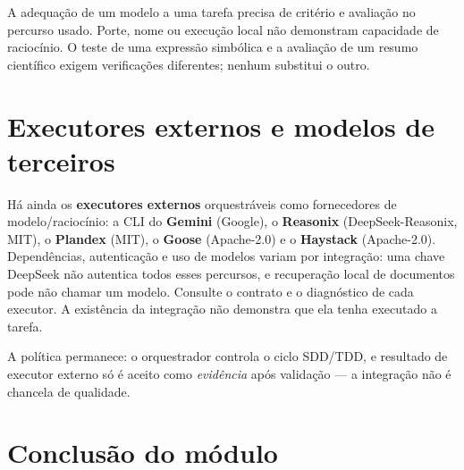 \begin{limite}
A adequação de um modelo a uma tarefa precisa de critério e avaliação no
percurso usado. Porte, nome ou execução local não demonstram capacidade de
raciocínio. O teste de uma expressão simbólica e a avaliação de um resumo
científico exigem verificações diferentes; nenhum substitui o outro.
\end{limite}

\clearpage
\section{Executores externos e modelos de terceiros}


\begin{descricao}
Há ainda os \textbf{executores externos} orquestráveis como fornecedores de
modelo/raciocínio: a CLI do \textbf{Gemini} (Google), o \textbf{Reasonix}
(DeepSeek-Reasonix, MIT), o \textbf{Plandex} (MIT), o \textbf{Goose} (Apache-2.0) e
o \textbf{Haystack} (Apache-2.0). Dependências, autenticação e uso de modelos
variam por integração: uma chave DeepSeek não autentica todos esses
percursos, e recuperação local de documentos pode não chamar um modelo.
Consulte o contrato e o diagnóstico de cada executor. A existência da
integração não demonstra que ela tenha executado a tarefa.
\end{descricao}

\begin{aviso}
A política permanece: o orquestrador controla o ciclo SDD/TDD, e resultado de
executor externo só é aceito como {\emph{evidência}} após validação — a integração
não é chancela de qualidade.
\end{aviso}

\section{Conclusão do módulo}

